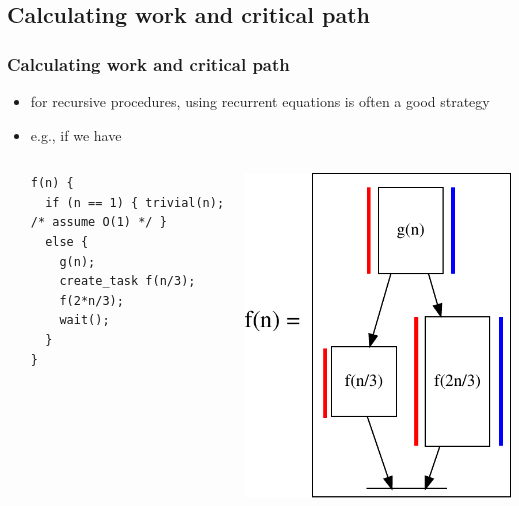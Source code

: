 \documentclass[12pt,dvipdfmx]{beamer}
\begin{document}
\subsection{Calculating work and critical path}
\begin{frame}[fragile]
\frametitle{Calculating work and critical
  path}

\begin{itemize}
\item for recursive procedures, 
  using recurrent equations is often a good
  strategy
\item e.g., if we have
  \begin{columns}
    \begin{column}{0.6\textwidth}
\begin{lstlisting}
f(n) {
  if (n == 1) { trivial(n); /* assume O(1) */ }
  else {
    g(n);
    create_task f(n/3);
    f(2*n/3);
    wait();
  }
}    
\end{lstlisting}
    \end{column}
    \begin{column}{0.3\textwidth}
\begin{center}
\includegraphics[width=\textwidth]{out/pdf/svg/dag_f.pdf}  

\end{center}
\end{column}
\end{columns}
\end{itemize}
\end{frame}
\end{document}
